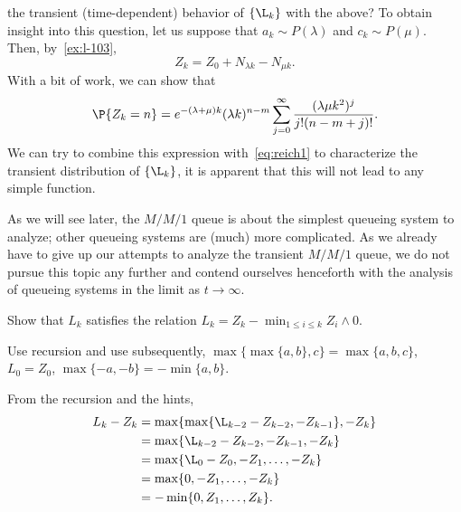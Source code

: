  the transient (time-dependent) behavior of $\{\L_k\}$ with the above?
To obtain insight into this question, let us suppose that $a_k\sim P(\lambda)$ and $c_k \sim P(\mu)$.
Then, by~\cref{ex:l-103},
\begin{equation*}
 Z_k = Z_0+N_{\lambda k} - N_{\mu k}.
\end{equation*}
With a bit of work, we can show that
\begin{equation*}
 \P{Z_k=n}
= e^{-(\lambda+\mu)k} (\lambda k)^{n-m} \sum_{j=0}^\infty
\frac{(\lambda\mu k^2)^j} {j!(n-m+j)!}.
\end{equation*}
We can try to combine this expression with~\cref{eq:reich1} to characterize the transient distribution of $\{\L_k\}$, it is apparent that this will  not lead to any simple function.

As we will see later, the $M/M/1$ queue is about the simplest queueing system to analyze; other queueing systems are (much) more complicated. As we already have to give up our attempts to analyze the transient $M/M/1$ queue, we do not pursue this topic any further and contend ourselves henceforth with the analysis of queueing systems in the limit as $t\to\infty$.


\begin{exercise}\label{ex:l-133}
Show that $L_k$ satisfies the relation $L_k = Z_k - \min_{1\leq i \leq k} Z_i\wedge 0$.
\begin{hint}
  Use recursion and use subsequently,
$\max\{\max\{a,b\}, c\} = \max\{a,b,c\}$, $L_0 = Z_0$, $\max\{-a, -b \} = -\min\{a,b\}$.
\end{hint}
\begin{solution}
From the recursion and the hints,
\begin{equation*}
 \begin{split}
 L_k - Z_{k}
&= \max\{\max\{\L_{k-2} - Z_{k-2}, -Z_{k-1}\}, -Z_k\} \\
&= \max\{\L_{k-2} - Z_{k-2}, -Z_{k-1}, -Z_k\} \\
&= \max\{\L_{0} - Z_{0}, -Z_1, \ldots, -Z_k\} \\
&= \max\{0, -Z_1, \ldots, -Z_k\} \\
&= - \min\{0, Z_1, \ldots, Z_k\}.
 \end{split}
 \end{equation*}
\end{solution}
\end{exercise}


